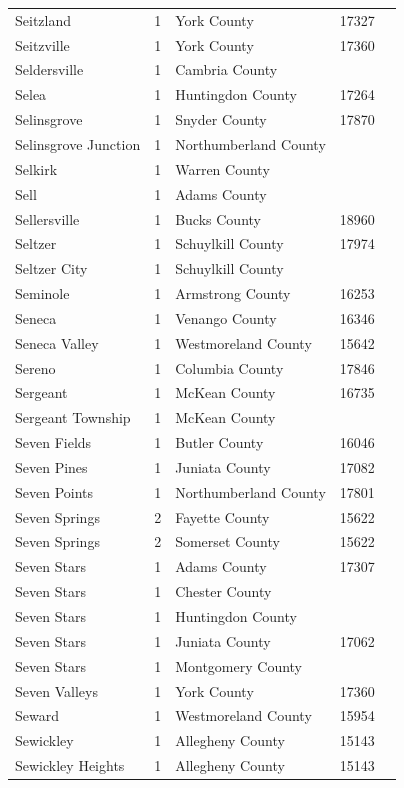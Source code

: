 \documentclass{article}
\begin{document}
\begin{tabular}{lllll}
Seitzland & 1 & York County & 17327 &  \\
Seitzville & 1 & York County & 17360 &  \\
Seldersville & 1 & Cambria County &  &  \\
Selea & 1 & Huntingdon County & 17264 &  \\
Selinsgrove & 1 & Snyder County & 17870 &  \\
Selinsgrove Junction & 1 & Northumberland County &  &  \\
Selkirk & 1 & Warren County &  &  \\
Sell & 1 & Adams County &  &  \\
Sellersville & 1 & Bucks County & 18960 &  \\
Seltzer & 1 & Schuylkill County & 17974 &  \\
Seltzer City & 1 & Schuylkill County &  &  \\
Seminole & 1 & Armstrong County & 16253 &  \\
Seneca & 1 & Venango County & 16346 &  \\
Seneca Valley & 1 & Westmoreland County & 15642 &  \\
Sereno & 1 & Columbia County & 17846 &  \\
Sergeant & 1 & McKean County & 16735 &  \\
Sergeant Township & 1 & McKean County &  &  \\
Seven Fields & 1 & Butler County & 16046 &  \\
Seven Pines & 1 & Juniata County & 17082 &  \\
Seven Points & 1 & Northumberland County & 17801 &  \\
Seven Springs & 2 & Fayette County & 15622 &  \\
Seven Springs & 2 & Somerset County & 15622 &  \\
Seven Stars & 1 & Adams County & 17307 &  \\
Seven Stars & 1 & Chester County &  &  \\
Seven Stars & 1 & Huntingdon County &  &  \\
Seven Stars & 1 & Juniata County & 17062 &  \\
Seven Stars & 1 & Montgomery County &  &  \\
Seven Valleys & 1 & York County & 17360 &  \\
Seward & 1 & Westmoreland County & 15954 &  \\
Sewickley & 1 & Allegheny County & 15143 &  \\
Sewickley Heights & 1 & Allegheny County & 15143 &  \\

\end{tabular}
\end{document}
